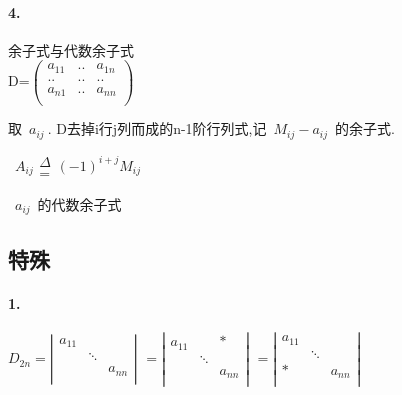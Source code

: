 \documentclass[printbox]{BHCexam}
\begin{document}
\paragraph{4.}余子式与代数余子式\\

D=$\left(                 %
\begin{array}{ccc}   %
  a_{11} & .. & a_{1n} \\  %
  .. & .. & ..\\  %
  a_{n1} & .. & a_{nn}\\ 
\end{array}
\right)$                 %

取~$a_{ij}~$. D去掉i行j列而成的n-1阶行列式,记~$M_{ij}-a_{ij}$~的余子式.\\
\centerline{~$A_{ij}　\substack{\Delta \\=} (-1)^{i+j}M_{ij}$~}
\centerline{~$a_{ij}$~的代数余子式}





\subsection{特殊}
\paragraph{1.}

$D_{2n}=\left|
\begin{array}{ccc}
  a_{11} &  & \\  %
   & \ddots & \\  %
   &  & a_{nn}\\  %

\end{array}\right|$
$=\left|
\begin{array}{ccc}
  a_{11} &  & *\\  %
   & \ddots & \\  %
   &  & a_{nn}\\  %
\end{array}\right|$ 
$=\left|
\begin{array}{ccc}
  a_{11} &  & \\  %
   & \ddots & \\  %
  * &  & a_{nn}\\  %
\end{array}\right|$ 
\end{document}
